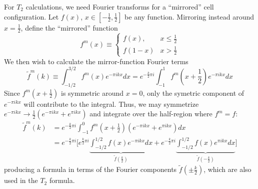 \documentclass[11pt,english]{article}
\begin{document}
For $T_2$ calculations, we need Fourier transforms for a
	``mirrored'' cell configuration.
Let $f(x)$, $x \in \left[ -\frac{1}{2}, \frac{1}{2} \right]$ be any function.
Mirroring instead around $x=\frac{1}{2}$, define the ``mirrored'' function
\begin{equation}
	f^m(x) \equiv
	\begin{cases}
		f(x),		& x \leq \frac{1}{2}		\\
		f(1-x)		& x > \frac{1}{2}
	\end{cases}
\end{equation}
We then wish to calculate the mirror-function Fourier terms
\begin{equation}
	\tilde{f}^m(k) \equiv \int_{-1/2}^{3/2} f^m(x) e^{-\pi i k x} dx
	= e^{-\frac{k}{2} \pi i} \int_{-1}^{1} f^m \left( x + \frac{1}{2} \right) e^{-\pi i k x} dx
\end{equation}
Since $f^m \left( x + \frac{1}{2} \right)$ is symmetric around $x=0$,
	only the symetric component of $e^{-\pi i k x}$ will contribute to the integral.
Thus, we may symmetrize $e^{-\pi i k x} \rightarrow \frac{1}{2}\left(e^{-\pi i k x}+e^{\pi i k x}\right)$
and integrate over the half-region where $f^m = f$:
\begin{align}
	\tilde{f}^m(k) & = e^{-\frac{k}{2} \pi i} \int_{-1}^{0} f^m \left( x + \frac{1}{2} \right)
	\left(e^{-\pi i k x}+e^{\pi i k x}\right) dx \\
	& = e^{-\frac{k}{2} \pi i}
	\Bigg[
		e^{\frac{k}{2} \pi i} \underbrace{\int_{-1/2}^{1/2} f(x) e^{-\pi i k x} dx}_{\tilde f \left( \frac{k}{2} \right)}
		+e^{-\frac{k}{2} \pi i} \underbrace{\int_{-1/2}^{1/2} f(x) e^{\pi i k x} dx}_{\tilde f \left( -\frac{k}{2} \right)}
	\Bigg]
\end{align}
producing a formula in terms of the Fourier components $\tilde{f}\left( \pm \frac{k}{2} \right)$,
	which are also used in the $T_2$ formula.
\end{document}
